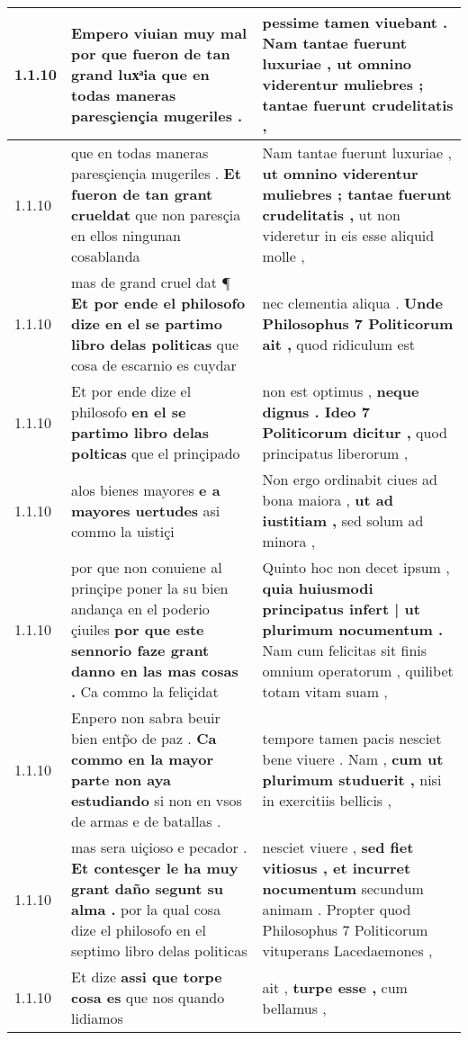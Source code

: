 \begin{tabular}{|p{1cm}|p{6.5cm}|p{6.5cm}|}
1.1.10 & Empero viuian muy mal \textbf{ por que fueron de tan grand luxͣia } que en todas maneras paresçiençia mugeriles . & pessime tamen viuebant . \textbf{ Nam tantae fuerunt luxuriae , } ut omnino viderentur muliebres ; tantae fuerunt crudelitatis , \\\hline
1.1.10 & que en todas maneras paresçiençia mugeriles . \textbf{ Et fueron de tan grant crueldat } que non paresçia en ellos ningunan cosablanda & Nam tantae fuerunt luxuriae , \textbf{ ut omnino viderentur muliebres ; tantae fuerunt crudelitatis , } ut non videretur in eis esse aliquid molle , \\\hline
1.1.10 & mas de grand cruel dat ¶ \textbf{ Et por ende el philosofo dize en el se partimo libro delas politicas } que cosa de escarnio es cuydar & nec clementia aliqua . \textbf{ Unde Philosophus 7 Politicorum ait , } quod ridiculum est \\\hline
1.1.10 & Et por ende dize el philosofo \textbf{ en el se partimo libro delas polticas } que el prinçipado & non est optimus , \textbf{ neque dignus . Ideo 7 Politicorum dicitur , } quod principatus liberorum , \\\hline
1.1.10 & alos bienes mayores \textbf{ e a mayores uertudes } asi commo la uistiçi & Non ergo ordinabit ciues ad bona maiora , \textbf{ ut ad iustitiam , } sed solum ad minora , \\\hline
1.1.10 & por que non conuiene al prinçipe poner la su bien andança en el poderio çiuiles \textbf{ por que este sennorio faze grant danno en las mas cosas . } Ca commo la feliçidat & Quinto hoc non decet ipsum , \textbf{ quia huiusmodi principatus infert | ut plurimum nocumentum . } Nam cum felicitas sit finis omnium operatorum , quilibet totam vitam suam , \\\hline
1.1.10 & Enpero non sabra beuir bien entp̃o de paz . \textbf{ Ca commo en la mayor parte non aya estudiando } si non en vsos de armas e de batallas . & tempore tamen pacis nesciet bene viuere . Nam , \textbf{ cum ut plurimum studuerit , } nisi in exercitiis bellicis , \\\hline
1.1.10 & mas sera uiçioso e pecador . \textbf{ Et contesçer le ha muy grant daño segunt su alma . } por la qual cosa dize el philosofo en el septimo libro delas politicas & nesciet viuere , \textbf{ sed fiet vitiosus , et incurret nocumentum } secundum animam . Propter quod Philosophus 7 Politicorum vituperans Lacedaemones , \\\hline
1.1.10 & Et dize \textbf{ assi que torpe cosa es } que nos quando lidiamos & ait , \textbf{ turpe esse , } cum bellamus , \\\hline

\end{tabular}
